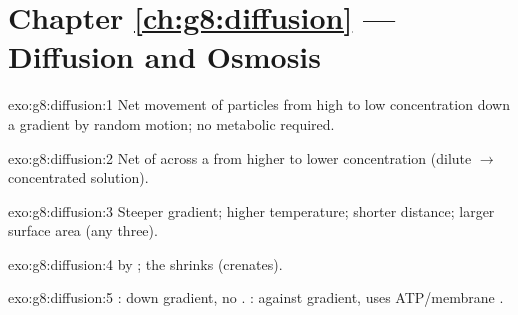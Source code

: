 \section*{Chapter \ref{ch:g8:diffusion} --- Diffusion and Osmosis}

\begin{solution}{exo:g8:diffusion:1}
Net movement of particles from high to low concentration down a gradient
by random motion; no metabolic  required.
\end{solution}

\begin{solution}{exo:g8:diffusion:2}
Net  of  across a  from higher
to lower  concentration (dilute $\to$ concentrated solution).
\end{solution}

\begin{solution}{exo:g8:diffusion:3}
Steeper gradient; higher temperature; shorter distance; larger surface
area (any three).
\end{solution}

\begin{solution}{exo:g8:diffusion:4}
  by ; the  shrinks (crenates).
\end{solution}

\begin{solution}{exo:g8:diffusion:5}
: down gradient, no  . : against
gradient, uses ATP/membrane .
\end{solution}

